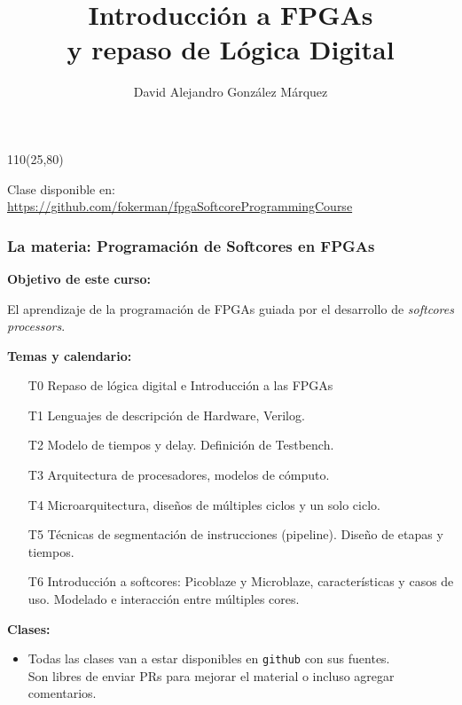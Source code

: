 \documentclass[aspectratio=169]{beamer}
\title{\Huge Introducción a FPGAs\\ \large y repaso de Lógica Digital}
\author{David Alejandro González Márquez}
\date{}
\begin{document}
\begin{frame}[plain]
    \titlepage
    \begin{textblock}{110}(25,80)
    \begin{tcolorbox}[size=small,width=\textwidth,colback={gray!30},title={}]
    \begin{center}
     \scriptsize Clase disponible en: \url{https://github.com/fokerman/fpgaSoftcoreProgrammingCourse}
    \end{center}
    \end{tcolorbox}
    \end{textblock}
\end{frame}

\begin{frame}[fragile]
    \frametitle{\large La materia: \Large Programación de Softcores en FPGAs}
    \textbf{Objetivo de este curso:}\\
    \vspace{-0.4cm}
    \begin{center}
    \textcolor{verdeuca}{El aprendizaje de la programación de FPGAs guiada por el desarrollo de \emph{softcores processors}.}\\
    \end{center}
    \pause
    \textbf{Temas y calendario:}\\
    \vspace{-0.2cm}
    \begin{itemize}
    \setlength\itemsep{0.0cm}
     \item[T0] Repaso de \textcolor{naranjauca}{lógica digital} e Introducción a las FPGAs
     \item[T1] Lenguajes de descripción de Hardware, \textcolor{naranjauca}{Verilog}.
     \item[T2] Modelo de \textcolor{naranjauca}{tiempos} y delay. Definición de \textcolor{naranjauca}{Testbench}.
     \pause
     \item[T3] \textcolor{naranjauca}{Arquitectura} de procesadores, modelos de cómputo.
     \item[T4] \textcolor{naranjauca}{Microarquitectura}, diseños de múltiples ciclos y un solo ciclo.
     \item[T5] Técnicas de segmentación de instrucciones (\textcolor{naranjauca}{pipeline}). Diseño de etapas y tiempos.
     \pause
     \item[T6] Introducción a \textcolor{naranjauca}{softcores}: Picoblaze y Microblaze, características y casos de uso. Modelado e interacción entre múltiples cores.
    \end{itemize}
    \pause
    \textbf{Clases:}\\
    \vspace{-0.2cm}
    \begin{itemize}
    \item \textcolor{verdeuca}{
    Todas las clases van a estar disponibles en \texttt{github} con sus fuentes.\\
    Son libres de enviar PRs para mejorar el material o incluso agregar comentarios.\\}
    \end{itemize}
\end{frame}
\end{document}
